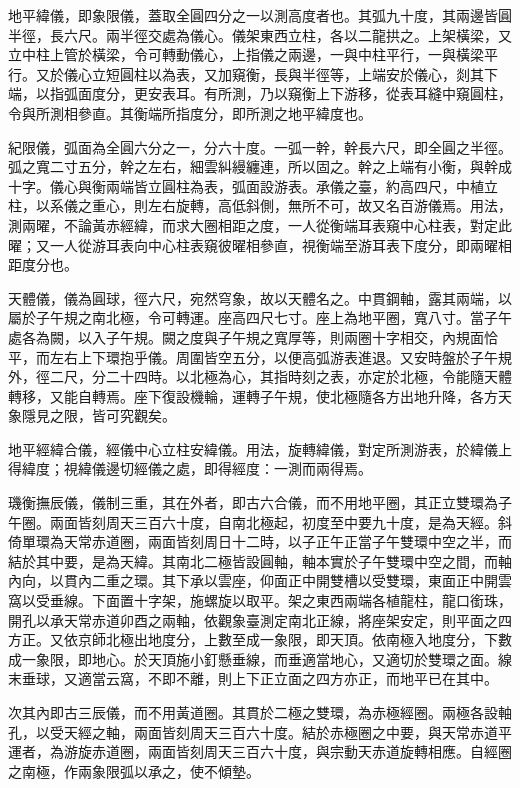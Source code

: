\begin{pinyinscope}
地平緯儀，即象限儀，蓋取全圓四分之一以測高度者也。其弧九十度，其兩邊皆圓半徑，長六尺。兩半徑交處為儀心。儀架東西立柱，各以二龍拱之。上架橫梁，又立中柱上管於橫梁，令可轉動儀心，上指儀之兩邊，一與中柱平行，一與橫梁平行。又於儀心立短圓柱以為表，又加窺衡，長與半徑等，上端安於儀心，剡其下端，以指弧面度分，更安表耳。有所測，乃以窺衡上下游移，從表耳縫中窺圓柱，令與所測相參直。其衡端所指度分，即所測之地平緯度也。

紀限儀，弧面為全圓六分之一，分六十度。一弧一幹，幹長六尺，即全圓之半徑。弧之寬二寸五分，幹之左右，細雲糾縵纏連，所以固之。幹之上端有小衡，與幹成十字。儀心與衡兩端皆立圓柱為表，弧面設游表。承儀之臺，約高四尺，中植立柱，以系儀之重心，則左右旋轉，高低斜側，無所不可，故又名百游儀焉。用法，測兩曜，不論黃赤經緯，而求大圈相距之度，一人從衡端耳表窺中心柱表，對定此曜；又一人從游耳表向中心柱表窺彼曜相參直，視衡端至游耳表下度分，即兩曜相距度分也。

天體儀，儀為圓球，徑六尺，宛然穹象，故以天體名之。中貫鋼軸，露其兩端，以屬於子午規之南北極，令可轉運。座高四尺七寸。座上為地平圈，寬八寸。當子午處各為闕，以入子午規。闕之度與子午規之寬厚等，則兩圈十字相交，內規面恰平，而左右上下環抱乎儀。周圍皆空五分，以便高弧游表進退。又安時盤於子午規外，徑二尺，分二十四時。以北極為心，其指時刻之表，亦定於北極，令能隨天體轉移，又能自轉焉。座下復設機輪，運轉子午規，使北極隨各方出地升降，各方天象隱見之限，皆可究觀矣。

地平經緯合儀，經儀中心立柱安緯儀。用法，旋轉緯儀，對定所測游表，於緯儀上得緯度；視緯儀邊切經儀之處，即得經度：一測而兩得焉。

璣衡撫辰儀，儀制三重，其在外者，即古六合儀，而不用地平圈，其正立雙環為子午圈。兩面皆刻周天三百六十度，自南北極起，初度至中要九十度，是為天經。斜倚單環為天常赤道圈，兩面皆刻周日十二時，以子正午正當子午雙環中空之半，而結於其中要，是為天緯。其南北二極皆設圓軸，軸本實於子午雙環中空之間，而軸內向，以貫內二重之環。其下承以雲座，仰面正中開雙槽以受雙環，東面正中開雲窩以受垂線。下面置十字架，施螺旋以取平。架之東西兩端各植龍柱，龍口銜珠，開孔以承天常赤道卯酉之兩軸，依觀象臺測定南北正線，將座架安定，則平面之四方正。又依京師北極出地度分，上數至成一象限，即天頂。依南極入地度分，下數成一象限，即地心。於天頂施小釘懸垂線，而垂適當地心，又適切於雙環之面。線末垂球，又適當云窩，不即不離，則上下正立面之四方亦正，而地平已在其中。

次其內即古三辰儀，而不用黃道圈。其貫於二極之雙環，為赤極經圈。兩極各設軸孔，以受天經之軸，兩面皆刻周天三百六十度。結於赤極圈之中要，與天常赤道平運者，為游旋赤道圈，兩面皆刻周天三百六十度，與宗動天赤道旋轉相應。自經圈之南極，作兩象限弧以承之，使不傾墊。


\end{pinyinscope}
